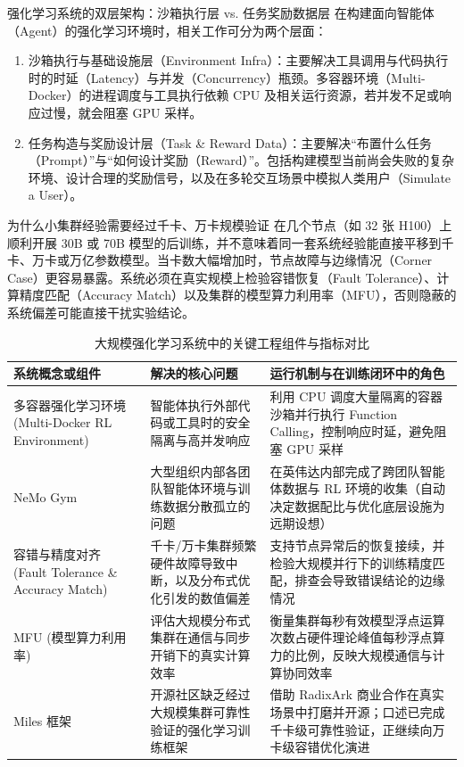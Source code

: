 \documentclass[UTF8,a4paper,11pt,fontset=fandol]{ctexart}
\begin{document}
\begin{knowledgebox}{强化学习系统的双层架构：沙箱执行层 vs. 任务奖励数据层}
在构建面向智能体（Agent）的强化学习环境时，相关工作可分为两个层面：
\begin{enumerate}
\item 沙箱执行与基础设施层（Environment Infra）：主要解决工具调用与代码执行时的时延（Latency）与并发（Concurrency）瓶颈。多容器环境（Multi-Docker）的进程调度与工具执行依赖 CPU 及相关运行资源，若并发不足或响应过慢，就会阻塞 GPU 采样。
\item 任务构造与奖励设计层（Task \& Reward Data）：主要解决“布置什么任务（Prompt）”与“如何设计奖励（Reward）”。包括构建模型当前尚会失败的复杂环境、设计合理的奖励信号，以及在多轮交互场景中模拟人类用户（Simulate a User）。
\end{enumerate}
\end{knowledgebox}
\begin{warningbox}{为什么小集群经验需要经过千卡、万卡规模验证}
在几个节点（如 32 张 H100）上顺利开展 30B 或 70B 模型的后训练，并不意味着同一套系统经验能直接平移到千卡、万卡或万亿参数模型。当卡数大幅增加时，节点故障与边缘情况（Corner Case）更容易暴露。系统必须在真实规模上检验容错恢复（Fault Tolerance）、计算精度匹配（Accuracy Match）以及集群的模型算力利用率（MFU），否则隐蔽的系统偏差可能直接干扰实验结论。
\end{warningbox}
\begin{table}[H]\centering\small
\caption{大规模强化学习系统中的关键工程组件与指标对比}
\begin{tabular}{>{\raggedright\arraybackslash}p{\dimexpr(\linewidth-6\tabcolsep)/3\relax}>{\raggedright\arraybackslash}p{\dimexpr(\linewidth-6\tabcolsep)/3\relax}>{\raggedright\arraybackslash}p{\dimexpr(\linewidth-6\tabcolsep)/3\relax}}
\toprule
系统概念或组件 & 解决的核心问题 & 运行机制与在训练闭环中的角色\\\midrule
多容器强化学习环境 (Multi-Docker RL Environment) & 智能体执行外部代码或工具时的安全隔离与高并发响应 & 利用 CPU 调度大量隔离的容器沙箱并行执行 Function Calling，控制响应时延，避免阻塞 GPU 采样\\[4pt]
NeMo Gym & 大型组织内部各团队智能体环境与训练数据分散孤立的问题 & 在英伟达内部完成了跨团队智能体数据与 RL 环境的收集（自动决定数据配比与优化底层设施为远期设想）\\[4pt]
容错与精度对齐 (Fault Tolerance \& Accuracy Match) & 千卡/万卡集群频繁硬件故障导致中断，以及分布式优化引发的数值偏差 & 支持节点异常后的恢复接续，并检验大规模并行下的训练精度匹配，排查会导致错误结论的边缘情况\\[4pt]
MFU (模型算力利用率) & 评估大规模分布式集群在通信与同步开销下的真实计算效率 & 衡量集群每秒有效模型浮点运算次数占硬件理论峰值每秒浮点算力的比例，反映大规模通信与计算协同效率\\[4pt]
Miles 框架 & 开源社区缺乏经过大规模集群可靠性验证的强化学习训练框架 & 借助 RadixArk 商业合作在真实场景中打磨并开源；口述已完成千卡级可靠性验证，正继续向万卡级容错优化演进\\[4pt]
\bottomrule\end{tabular}\end{table}
\end{document}
